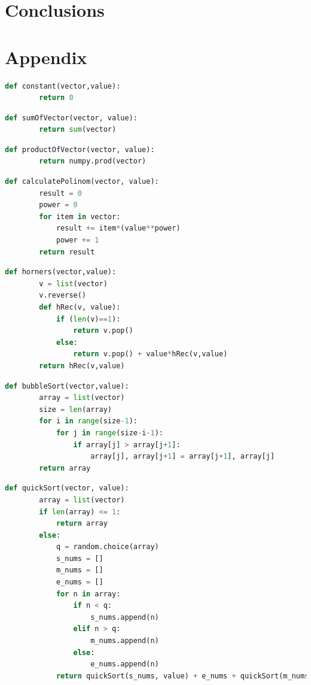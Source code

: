 \documentclass[a4paper,article,14pt]{extarticle}
\begin{document}
	
	\section{Conclusions}
	
	\section{Appendix}
	\begin{lstlisting}[language=Python, caption=Constant function]
	def constant(vector,value): 
		return 0
	\end{lstlisting}
	
	\begin{lstlisting}[language=Python, caption=Sum of elements]
	def sumOfVector(vector, value):
		return sum(vector)
	\end{lstlisting}
	
	\begin{lstlisting}[language=Python, caption=Product of elements]
	def productOfVector(vector, value):
		return numpy.prod(vector)
	\end{lstlisting}
	
	\begin{lstlisting}[language=Python, caption=Direct polinom calculation]
	def calculatePolinom(vector, value):
		result = 0
		power = 0
		for item in vector:
			result += item*(value**power)
			power += 1
		return result
	\end{lstlisting}
	
	\begin{lstlisting}[language=Python, caption=Polinom calculation by Horner's method]
	def horners(vector,value):
		v = list(vector)
		v.reverse()
		def hRec(v, value):
			if (len(v)==1):
				return v.pop()
			else:
				return v.pop() + value*hRec(v,value)
		return hRec(v,value)
	\end{lstlisting}
	
	\begin{lstlisting}[language=Python, caption=Bubble sort]
	def bubbleSort(vector,value):
		array = list(vector)
		size = len(array)
		for i in range(size-1):
			for j in range(size-i-1):
				if array[j] > array[j+1]:
					array[j], array[j+1] = array[j+1], array[j]
		return array
	\end{lstlisting}
	
	\begin{lstlisting}[language=Python, caption=Bubble sort]
	def quickSort(vector, value):
		array = list(vector)
		if len(array) <= 1:
			return array
		else:
			q = random.choice(array)
			s_nums = []
			m_nums = []
			e_nums = []
			for n in array:
				if n < q:
					s_nums.append(n)
				elif n > q:
					m_nums.append(n)
				else:
					e_nums.append(n)
			return quickSort(s_nums, value) + e_nums + quickSort(m_nums, value)
	\end{lstlisting}
	
	
	
\end{document}
